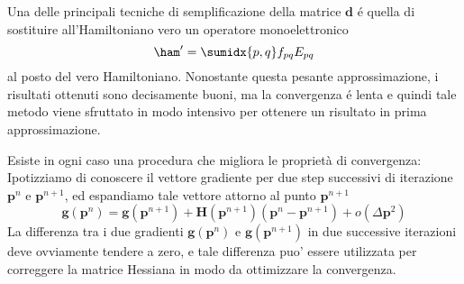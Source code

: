 Una delle principali tecniche di semplificazione della matrice
$\mathbf{d}$ \'e quella di sostituire all'Hamiltoniano vero un operatore
monoelettronico
$$
\ham^{\prime} = \sumidx{p,q}f_{pq} E_{pq}
$$
al posto del vero Hamiltoniano. Nonostante questa pesante
approssimazione, i risultati ottenuti sono decisamente buoni, ma la
convergenza \'e lenta e quindi tale metodo viene sfruttato in modo
intensivo per ottenere un risultato in prima approssimazione.

Esiste in ogni caso una procedura che migliora le propriet\`a di
convergenza: Ipotizziamo di conoscere il vettore gradiente per due step
successivi di iterazione $\mathbf{p}^{n} $ e $\mathbf{p}^{n+1}$, ed espandiamo 
tale vettore attorno al punto $\mathbf{p}^{n+1}$
$$
\mathbf{g}\left(\mathbf{p}^{n}\right) =
\mathbf{g}\left(\mathbf{p}^{n+1}\right) +
\mathbf{H}\left(\mathbf{p}^{n+1}\right) \left(\mathbf{p}^{n} -
\mathbf{p}^{n+1}\right) + o(\Delta\mathbf{p}^2)
$$
La differenza tra i due gradienti
$\mathbf{g}\left(\mathbf{p}^{n}\right)$
e $\mathbf{g}\left(\mathbf{p}^{n+1}\right)$ in due successive
iterazioni deve ovviamente tendere a zero, e tale differenza puo'
essere utilizzata per correggere la matrice Hessiana in modo da
ottimizzare la convergenza.


